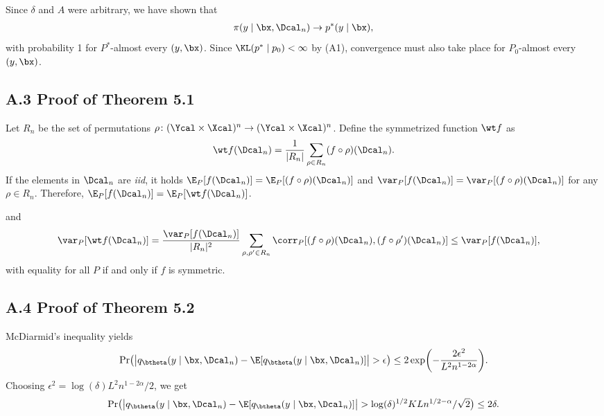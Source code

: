 \documentclass[aspectratio=169,10pt]{beamer}
\newcommand{\currentheading}{\ifx\insertsubsection\empty\insertsection\else\insertsubsection\fi}
\begin{document}
\begin{frame}{\currentheading}
Since $\delta$ and $A$ were arbitrary, we have shown that
\begin{align*}
	\pi(y\mid \bx, \Dcal_n)  \to p^*(y \mid \bx),
\end{align*}
with probability 1 for $P^*$-almost every $(y, \bx)$. Since $\KL(p^* \mid p_0) < \infty$ by (A1), convergence must also take place for $P_0$-almost every $(y, \bx)$.
\end{frame}

\subsection{A.3 Proof of Theorem 5.1}

\begin{frame}{\currentheading}
Let $R_n$ be the set of permutations $\rho\colon (\Ycal \times \Xcal)^n \to  (\Ycal \times \Xcal)^n$. Define the symmetrized function $\wt f$ as
$$\wt f(\Dcal_n) = \frac 1 {|R_n|} \sum_{\rho \in R_n} (f \circ \rho)(\Dcal_n).$$
If the elements in $\Dcal_n$ are \emph{iid}, it holds $\E_P[f(\Dcal_n)] = \E_P[(f \circ \rho)(\Dcal_n)]$ and $\var_P[f(\Dcal_n)] = \var_P[(f \circ \rho)(\Dcal_n)]$ for any $\rho \in R_n$. Therefore, $\E_P[f(\Dcal_n)] = \E_P[\wt f(\Dcal_n)]$.
\end{frame}

\begin{frame}{\currentheading}
and
\begin{align*}
	\var_P[\wt f(\Dcal_n)]
	 & = \frac{\var_P[f(\Dcal_n)]}{|R_n|^2} \sum_{\rho, \rho' \in R_n} \corr_P[(f \circ \rho)(\Dcal_n), (f \circ \rho')(\Dcal_n)]  		\le \var_P[f(\Dcal_n)],
\end{align*}
with equality for all $P$ if and only if $f$ is symmetric.
\end{frame}

\subsection{A.4 Proof of Theorem 5.2}

\begin{frame}{\currentheading}
McDiarmid's inequality yields
\begin{align*}
\Pr\bigl(	\bigl| q_{\btheta}(y \mid \bx, \Dcal_n) - \E[q_{\btheta}(y \mid \bx, \Dcal_n)] \bigr| > \epsilon\bigr) \le 2\exp\biggl(-\frac{2 \epsilon^2}{L^2 n^{1 - 2\alpha}}\biggr).
\end{align*}
Choosing $\epsilon^2 = \log(\delta)L^2 n^{1 - 2\alpha} / 2$, we get
\begin{align*}
	\Pr\bigl(	\bigl| q_{\btheta}(y \mid \bx, \Dcal_n) - \E[q_{\btheta}(y \mid \bx, \Dcal_n)] \bigr| > \log(\delta)^{1/2}K L n^{1/2 - \alpha} / \sqrt{2} \bigr) \le 2\delta.
\end{align*}
\end{frame}
\end{document}
